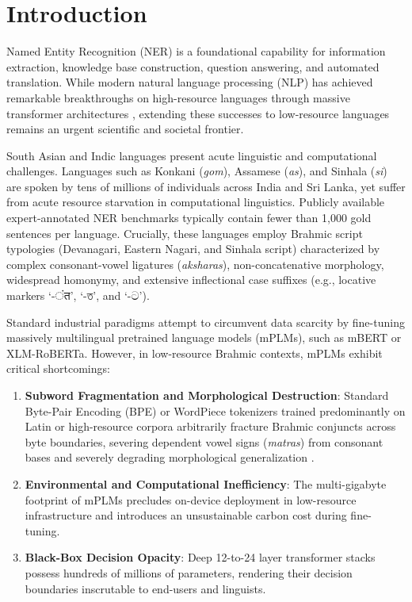 \documentclass[default,iicol]{sn-jnl}
\begin{document}

\maketitle

\section{Introduction}\label{sec1}

Named Entity Recognition (NER) is a foundational capability for information extraction, knowledge base construction, question answering, and automated translation. While modern natural language processing (NLP) has achieved remarkable breakthroughs on high-resource languages through massive transformer architectures \cite{vaswani2017attention}, extending these successes to low-resource languages remains an urgent scientific and societal frontier. 

South Asian and Indic languages present acute linguistic and computational challenges. Languages such as Konkani (\textit{gom}), Assamese (\textit{as}), and Sinhala (\textit{si}) are spoken by tens of millions of individuals across India and Sri Lanka, yet suffer from acute resource starvation in computational linguistics. Publicly available expert-annotated NER benchmarks typically contain fewer than 1,000 gold sentences per language. Crucially, these languages employ Brahmic script typologies (Devanagari, Eastern Nagari, and Sinhala script) characterized by complex consonant-vowel ligatures (\textit{aksharas}), non-concatenative morphology, widespread homonymy, and extensive inflectional case suffixes (e.g., locative markers `-ंत', `-ত', and `-ට'). 

Standard industrial paradigms attempt to circumvent data scarcity by fine-tuning massively multilingual pretrained language models (mPLMs), such as mBERT or XLM-RoBERTa. However, in low-resource Brahmic contexts, mPLMs exhibit critical shortcomings:
\begin{enumerate}
    \item \textbf{Subword Fragmentation and Morphological Destruction}: Standard Byte-Pair Encoding (BPE) or WordPiece tokenizers trained predominantly on Latin or high-resource corpora arbitrarily fracture Brahmic conjuncts across byte boundaries, severing dependent vowel signs (\textit{matras}) from consonant bases and severely degrading morphological generalization \cite{kakwani2020indicnlpsuite}.
    \item \textbf{Environmental and Computational Inefficiency}: The multi-gigabyte footprint of mPLMs precludes on-device deployment in low-resource infrastructure and introduces an unsustainable carbon cost during fine-tuning.
    \item \textbf{Black-Box Decision Opacity}: Deep 12-to-24 layer transformer stacks possess hundreds of millions of parameters, rendering their decision boundaries inscrutable to end-users and linguists.
\end{enumerate}
\end{document}
